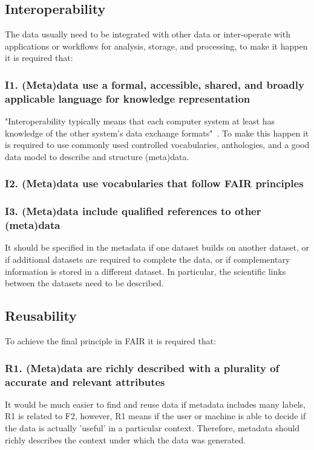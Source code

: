 \subsection*{Interoperability}
The data usually need to be integrated with other data or inter-operate with applications or workflows for analysis, storage, and processing, to make it happen it is required that:


\subsubsection*{I1. (Meta)data use a formal, accessible, shared, and broadly applicable language for knowledge representation}

"Interoperability typically means that each computer system at least has knowledge of the other system’s data exchange formats"~\cite{FAIR_Principles}. To make this happen it is required to use commonly used controlled vocabularies, anthologies, and a good data model to describe and structure (meta)data.
 
\subsubsection*{I2. (Meta)data use vocabularies that follow FAIR principles}

\subsubsection*{I3. (Meta)data include qualified references to other (meta)data}
It should be specified in the metadata if one dataset builds on another dataset, or if additional datasets are required to complete the data, or if complementary information is stored in a different dataset. In particular, the scientific links between the datasets need to be described.

\subsection*{Reusability}
To achieve the final principle in FAIR it is required that:

\subsubsection*{R1. (Meta)data are richly described with a plurality of accurate and relevant attributes}
It would be much easier to find and reuse data if metadata includes many labels, R1 is related to F2, however, R1 means if the user or machine is able to decide if the data is actually 'useful' in a particular context. Therefore, metadata should richly describes the context under which the data was generated. 

